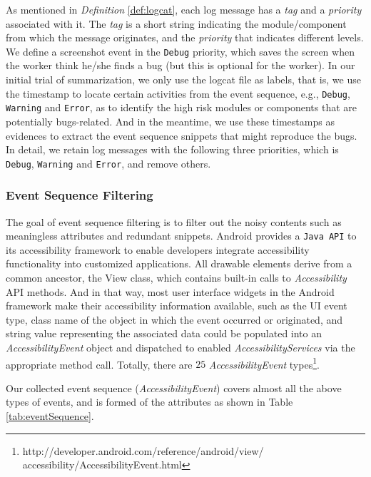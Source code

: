 \documentclass[10pt,conference]{IEEEtran}
\begin{document}
As mentioned in \emph{Definition} \ref{def:logcat}, each log message has a \textit{tag} and a \textit{priority} associated with
it.  The \textit{tag} is a short string indicating the module/component from which the message originates, and the \textit{priority} that indicates different levels. 
We define a screenshot event
in the \texttt{Debug} priority, which saves the screen when the worker think he/she finds a bug (but this is optional for the worker).
In our initial trial of summarization, we only use the logcat file as labels, that is, we use the timestamp to locate 
certain activities from the event sequence, e.g., \texttt{Debug}, \texttt{Warning}
and \texttt{Error}, as to identify the high risk modules or components that are potentially
bugs-related. And in the meantime, we use these timestamps as evidences to extract the event sequence snippets that might
reproduce the bugs. In detail, we retain log messages with the following three priorities, which is \texttt{Debug}, \texttt{Warning}
and \texttt{Error}, and remove others.

\subsubsection{Event Sequence Filtering}
The goal of event sequence filtering is to filter out the noisy contents such as meaningless attributes and redundant snippets.
Android provides a \texttt{Java API} to its accessibility framework to enable developers integrate accessibility functionality into
customized applications. All drawable elements derive from a common ancestor, the View class, which contains built-in calls
to \emph{Accessibility} API methods. And in that way, most user interface widgets in the Android framework make their accessibility
information available, such as the UI event type, class name of the object in which the event occurred or originated, and string value
representing the associated data could be populated into an \emph{AccessibilityEvent} object and dispatched to enabled
\emph{AccessibilityServices} via the appropriate method call. Totally, there are $25$ \emph{AccessibilityEvent}
types\footnote{http://developer.android.com/reference/android/view/\\accessibility/AccessibilityEvent.html}.

Our collected event sequence (\emph{AccessibilityEvent}) covers almost all the above types of events, and
is formed of the attributes as shown in Table \ref{tab:eventSequence}.
\end{document}
